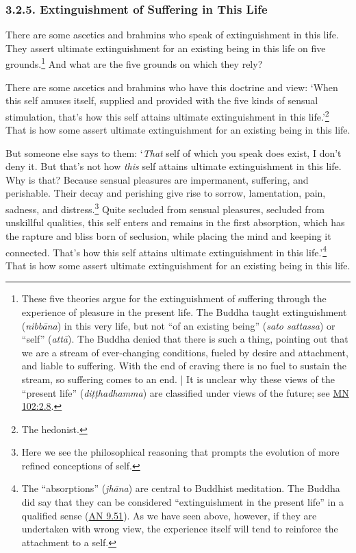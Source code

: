 \documentclass[12pt,openany]{book}%
\begin{document}
\subsubsection*{3.2.5. Extinguishment of Suffering in This Life }

There are some ascetics and brahmins who speak of extinguishment in this life. They assert ultimate extinguishment for an existing being in this life on five grounds.\footnote{These five theories argue for the extinguishment of suffering through the experience of pleasure in the present life. The Buddha taught extinguishment (\textit{\textsanskrit{nibbāna}}) in this very life, but not “of an existing being” (\textit{sato sattassa}) or “self” (\textit{\textsanskrit{attā}}). The Buddha denied that there is such a thing, pointing out that we are a stream of ever-changing conditions, fueled by desire and attachment, and liable to suffering. With the end of craving there is no fuel to sustain the stream, so suffering comes to an end. | It is unclear why these views of the “present life” (\textit{\textsanskrit{diṭṭhadhamma}}) are classified under views of the future; see \href{https://suttacentral.net/mn102/en/sujato\#2.8}{MN 102:2.8}. } And what are the five grounds on which they rely? 

There are some ascetics and brahmins who have this doctrine and view: ‘When this self amuses itself, supplied and provided with the five kinds of sensual stimulation, that’s how this self attains ultimate extinguishment in this life.’\footnote{The hedonist. } That is how some assert ultimate extinguishment for an existing being in this life. 

But someone else says to them: ‘\emph{That} self of which you speak does exist, I don’t deny it. But that’s not how \emph{this} self attains ultimate extinguishment in this life. Why is that? Because sensual pleasures are impermanent, suffering, and perishable. Their decay and perishing give rise to sorrow, lamentation, pain, sadness, and distress.\footnote{Here we see the philosophical reasoning that prompts the evolution of more refined conceptions of self. } Quite secluded from sensual pleasures, secluded from unskillful qualities, this self enters and remains in the first absorption, which has the rapture and bliss born of seclusion, while placing the mind and keeping it connected. That’s how this self attains ultimate extinguishment in this life.’\footnote{The “absorptions” (\textit{\textsanskrit{jhāna}}) are central to Buddhist meditation. The Buddha did say that they can be considered “extinguishment in the present life” in a qualified sense (\href{https://suttacentral.net/an9.51/en/sujato}{AN 9.51}). As we have seen above, however, if they are undertaken with wrong view, the experience itself will tend to reinforce the attachment to a self. } That is how some assert ultimate extinguishment for an existing being in this life. 
\end{document}
